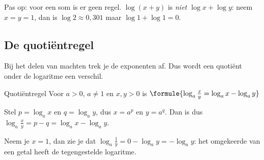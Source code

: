 
Pas op: voor een som is er geen regel. $\log(x + y)$ is \textit{niet} $\log x + \log y$: neem $x = y = 1$, dan is $\log 2 \approx 0{,}301$ maar $\log 1 + \log 1 = 0$.

\begin{oefeningen}
\end{oefeningen}

\subsection{De quotiëntregel}

Bij het delen van machten trek je de exponenten af. Dus wordt een quotiënt onder de logaritme een verschil.

\begin{theorie}
\begin{stelling}{Quotiëntregel}
Voor $a > 0$, $a \neq 1$ en $x, y > 0$ is \qquad $\formule{\log_a \frac{x}{y} = \log_a x - \log_a y}$
\end{stelling}
\begin{bewijs}
Stel $p = \log_a x$ en $q = \log_a y$, dus $x = a^p$ en $y = a^q$. Dan is
dus $\log_a \frac{x}{y} = p - q = \log_a x - \log_a y$.
\end{bewijs}
\end{theorie}

Neem je $x = 1$, dan zie je dat $\log_a \frac1y = 0 - \log_a y = -\log_a y$: het omgekeerde van een getal heeft de tegengestelde logaritme.


